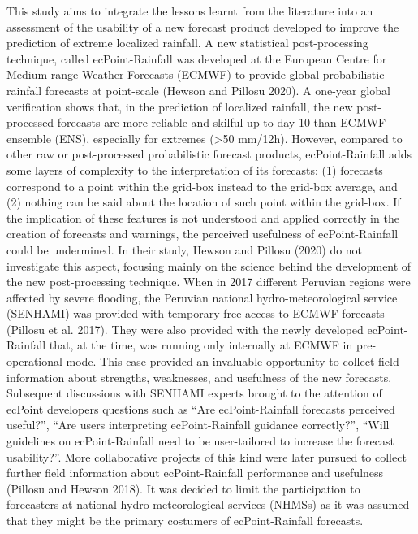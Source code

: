 \documentclass[twocol]{ametsocV5} %
\begin{document}
This study aims to integrate the lessons learnt from the literature into an assessment of the usability of a new forecast product developed to improve the prediction of extreme localized rainfall. A new statistical post-processing technique, called ecPoint-Rainfall was developed at the European Centre for Medium-range Weather Forecasts (ECMWF) to provide global probabilistic rainfall forecasts at point-scale (Hewson and Pillosu 2020). A one-year global verification shows that, in the prediction of localized rainfall, the new post-processed forecasts are more reliable and skilful up to day 10 than ECMWF ensemble (ENS), especially for extremes (>50 mm/12h). However, compared to other raw or post-processed probabilistic forecast products, ecPoint-Rainfall adds some layers of complexity to the interpretation of its forecasts: (1) forecasts correspond to a point within the grid-box instead to the grid-box average, and (2) nothing can be said about the location of such point within the grid-box. If the implication of these features is not understood and applied correctly in the creation of forecasts and warnings, the perceived usefulness of ecPoint-Rainfall could be undermined. In their study, Hewson and Pillosu (2020) do not investigate this aspect, focusing mainly on the science behind the development of the new post-processing technique.  
 When in 2017 different Peruvian regions were affected by severe flooding, the Peruvian national hydro-meteorological service (SENHAMI) was provided with temporary free access to ECMWF forecasts (Pillosu et al. 2017). They were also provided with the newly developed ecPoint-Rainfall that, at the time, was running only internally at ECMWF in pre-operational mode. This case provided an invaluable opportunity to collect field information about strengths, weaknesses, and usefulness of the new forecasts. Subsequent discussions with SENHAMI experts brought to the attention of ecPoint developers questions such as “Are ecPoint-Rainfall forecasts perceived useful?”, “Are users interpreting ecPoint-Rainfall guidance correctly?”, “Will guidelines on ecPoint-Rainfall need to be user-tailored to increase the forecast usability?”. More collaborative projects of this kind were later pursued to collect further field information about ecPoint-Rainfall performance and usefulness (Pillosu and Hewson 2018). It was decided to limit the participation to forecasters at national hydro-meteorological services (NHMSs) as it was assumed that they might be the primary costumers of ecPoint-Rainfall forecasts. 
 
\end{document}
